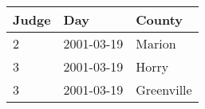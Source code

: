 
\begin{tabular}{|l|l|l|}
\hline
\textbf{Judge} & \textbf{Day} & \textbf{County} \\ \hline
2              & 2001-03-19   & Marion          \\ \hline
3              & 2001-03-19   & Horry           \\ \hline
3              & 2001-03-19   & Greenville      \\ \hline
\end{tabular}
